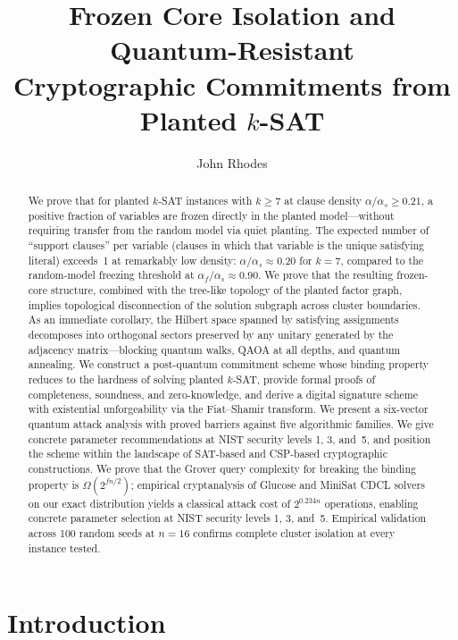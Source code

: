 \documentclass[11pt]{article}
\title{Frozen Core Isolation and Quantum-Resistant\\Cryptographic Commitments from Planted $k$-SAT}
\author{John Rhodes}
\date{}
\begin{document}
\maketitle

\begin{abstract}
We prove that for planted $k$-SAT instances with $k \geq 7$ at clause density $\alpha/\alpha_s \geq 0.21$, a positive fraction of variables are frozen directly in the planted model---without requiring transfer from the random model via quiet planting. The expected number of ``support clauses'' per variable (clauses in which that variable is the unique satisfying literal) exceeds~1 at remarkably low density: $\alpha/\alpha_s \approx 0.20$ for $k = 7$, compared to the random-model freezing threshold at $\alpha_f/\alpha_s \approx 0.90$. We prove that the resulting frozen-core structure, combined with the tree-like topology of the planted factor graph, implies topological disconnection of the solution subgraph across cluster boundaries. As an immediate corollary, the Hilbert space spanned by satisfying assignments decomposes into orthogonal sectors preserved by any unitary generated by the adjacency matrix---blocking quantum walks, QAOA at all depths, and quantum annealing. We construct a post-quantum commitment scheme whose binding property reduces to the hardness of solving planted $k$-SAT, provide formal proofs of completeness, soundness, and zero-knowledge, and derive a digital signature scheme with existential unforgeability via the Fiat--Shamir transform.  We present a six-vector quantum attack analysis with proved barriers against five algorithmic families. We give concrete parameter recommendations at NIST security levels 1, 3, and~5, and position the scheme within the landscape of SAT-based and CSP-based cryptographic constructions. We prove that the Grover query complexity for breaking the binding property is $\Omega(2^{fn/2})$; empirical cryptanalysis of Glucose and MiniSat CDCL solvers on our exact distribution yields a classical attack cost of $2^{0.234n}$ operations, enabling concrete parameter selection at NIST security levels 1, 3, and~5. Empirical validation across 100 random seeds at $n = 16$ confirms complete cluster isolation at every instance tested.
\end{abstract}

\section{Introduction}
\end{document}
